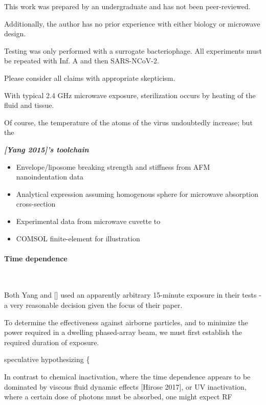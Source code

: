 \documentclass[fleqn,10pt]{article}
\begin{document}
This work was prepared by an undergraduate and has not been peer-reviewed. 

Additionally, the author has no prior experience with either biology or microwave design. 

Testing was only performed with a surrogate bacteriophage. All experiments must be repeated with Inf. A and then SARS-NCoV-2.

Please consider all claims with appropriate skepticism.


\begin{multicols}{1}

With typical 2.4 GHz microwave exposure, sterilization occurs by heating of the fluid and tissue.

Of course, the temperature of the atoms of the virus undoubtedly increase; but the 

\begin{toolchain}
	{\it \bf [Yang 2015]'s toolchain}
	\begin{itemize}
	\item Envelope/liposome breaking strength and stiffness from AFM nanoindentation data
	\item Analytical expression assuming homogenous sphere for microwave absorption cross-section
	\item Experimental data from microwave cuvette to 
	\item COMSOL finite-element for illustration
	\end{itemize}
\end{toolchain}


\paragraph{\textbf{Time dependence}}\


Both Yang and [] used an apparently arbitrary 15-minute exposure in their tests - a very reasonable decision given the focus of their paper. 

To determine the effectiveness against airborne particles, and to minimize the power required in a dwelling phased-array beam, we must first establish the required duration of exposure.

{\color{red} speculative hypothesizing \{ } 

In contrast to chemical inactivation, where the time dependence appears to be dominated by viscous fluid dynamic effects [Hirose 2017], or UV inactivation, where a certain dose of photons must be absorbed, one might expect RF 


\end{multicols}
\end{document}
